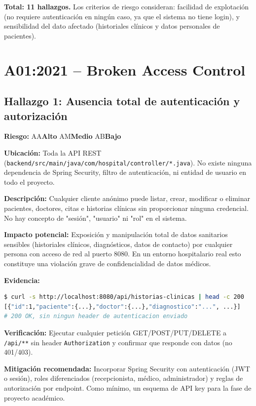 \documentclass[11pt,a4paper]{article}
\newcommand{\riesgo}[1]{%
  \ifx#1A\textcolor{riesgoAlto}{\textbf{Alto}}\fi
  \ifx#1M\textcolor{riesgoMedio}{\textbf{Medio}}\fi
  \ifx#1B\textcolor{riesgoBajo}{\textbf{Bajo}}\fi
}
\begin{document}
\textbf{Total: 11 hallazgos.} Los criterios de riesgo consideran: facilidad de
explotaci\'on (no requiere autenticaci\'on en ning\'un caso, ya que el sistema
no tiene login), y sensibilidad del dato afectado (historiales cl\'inicos y
datos personales de pacientes).

\newpage

\section{A01:2021 -- Broken Access Control}

\subsection{Hallazgo 1: Ausencia total de autenticaci\'on y autorizaci\'on}
\textbf{Riesgo:} \riesgo{A}

\textbf{Ubicaci\'on:} Toda la API REST (\texttt{backend/src/main/java/com/hospital/controller/*.java}).
No existe ninguna dependencia de Spring Security, filtro de autenticaci\'on,
ni entidad de usuario en todo el proyecto.

\textbf{Descripci\'on:} Cualquier cliente an\'onimo puede listar, crear,
modificar o eliminar pacientes, doctores, citas e historias cl\'inicas sin
proporcionar ninguna credencial. No hay concepto de "sesi\'on", "usuario" ni
"rol" en el sistema.

\textbf{Impacto potencial:} Exposici\'on y manipulaci\'on total de datos
sanitarios sensibles (historiales cl\'inicos, diagn\'osticos, datos de
contacto) por cualquier persona con acceso de red al puerto 8080. En un
entorno hospitalario real esto constituye una violaci\'on grave de
confidencialidad de datos m\'edicos.

\textbf{Evidencia:}
\begin{lstlisting}[language=bash]
$ curl -s http://localhost:8080/api/historias-clinicas | head -c 200
[{"id":1,"paciente":{...},"doctor":{...},"diagnostico":"...", ...}]
# 200 OK, sin ningun header de autenticacion enviado
\end{lstlisting}

\textbf{Verificaci\'on:} Ejecutar cualquier petici\'on GET/POST/PUT/DELETE a
\texttt{/api/**} sin header \texttt{Authorization} y confirmar que responde
con datos (no 401/403).

\textbf{Mitigaci\'on recomendada:} Incorporar Spring Security con
autenticaci\'on (JWT o sesi\'on), roles diferenciados (recepcionista, m\'edico,
administrador) y reglas de autorizaci\'on por endpoint. Como m\'inimo, un
esquema de API key para la fase de proyecto acad\'emico.
\end{document}
